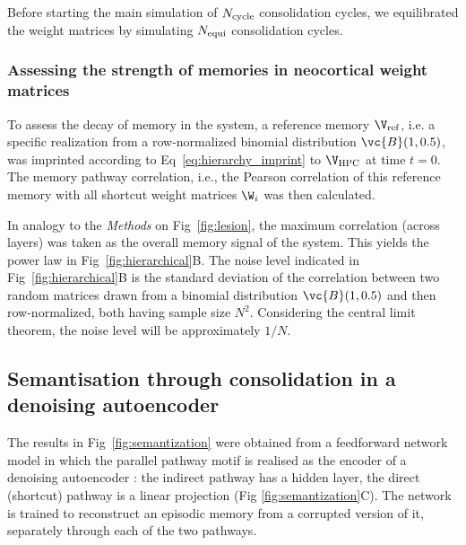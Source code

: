 Before starting the main simulation of $N_{\rm cycle}$ consolidation cycles, we equilibrated the weight matrices by simulating $N_{\rm equi}$ consolidation cycles.

\subsubsection{Assessing the strength of memories in neocortical weight matrices}
To assess the decay of memory in the system, a reference memory $\V_{\rm ref}$, i.e. a specific realization from a row-normalized binomial distribution $\vc{B}(1, 0.5)$, was imprinted according to Eq~\eqref{eq:hierarchy_imprint} to $\V_{\rm HPC}$ at time $t=0$. The memory pathway correlation, i.e., the Pearson correlation of this reference memory with all shortcut weight matrices $\W_i$ was then calculated.

In analogy to the {\em Methods} on Fig~\ref{fig:lesion}, the maximum correlation (across layers) was taken as the overall memory signal of the system. This yields the power law in Fig~\ref{fig:hierarchical}B.
The noise level indicated in Fig~\ref{fig:hierarchical}B is the standard deviation of the correlation between  two random matrices  drawn from a binomial distribution $\vc{B}(1, 0.5)$ and then row-normalized, both having sample size $N^2$. Considering the central limit theorem, the noise level will be approximately $1/N$.

\subsection{Semantisation through consolidation in a denoising autoencoder}
\label{ssec:ppt_methods_semantization}

The results in Fig~\ref{fig:semantization} were obtained from a feedforward
network model in which the parallel pathway motif is realised as the encoder
of a denoising autoencoder \cite{Vincent2010}: the indirect pathway has a
hidden layer, the direct (shortcut) pathway is a linear projection (Fig
\ref{fig:semantization}C). The network is trained to reconstruct an episodic
memory from a corrupted version of it, separately through each of the two
pathways.

